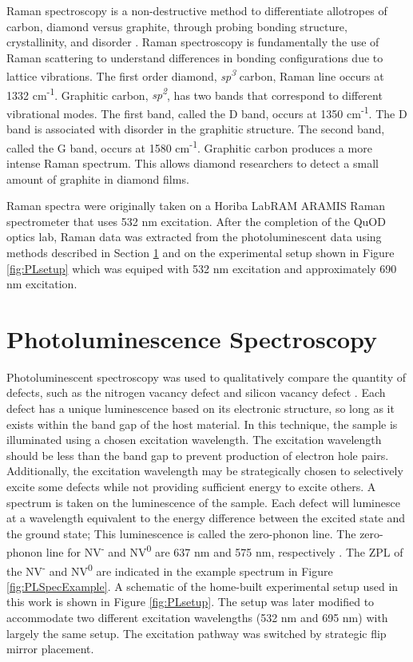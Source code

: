 Raman spectroscopy is a non-destructive method to differentiate allotropes of carbon, diamond versus graphite, through probing bonding structure, crystallinity, and disorder \cite{Knight1989CharacterizationSpectroscopy, Shroder1990AnalysisSpectroscopyb}. Raman spectroscopy is fundamentally the use of Raman scattering to understand differences in bonding configurations due to lattice vibrations. The first order diamond, \textit{sp\textsuperscript{3}} carbon, Raman line occurs at 1332 cm\textsuperscript{-1}. Graphitic carbon, \textit{sp\textsuperscript{2}}, has two bands that correspond to different vibrational modes. The first band, called the D band, occurs at 1350 cm\textsuperscript{-1}. The D band is associated with disorder in the graphitic structure. The second band, called the G band, occurs at 1580 cm\textsuperscript{-1}. Graphitic carbon produces a more intense Raman spectrum. This allows diamond researchers to detect a small amount of graphite in diamond films. 

Raman spectra were originally taken on a Horiba LabRAM ARAMIS Raman spectrometer that uses 532 nm excitation. After the completion of the QuOD optics lab, Raman data was extracted from the photoluminescent data using methods described in Section \ref{PL} and on the experimental setup shown in Figure \ref{fig:PLsetup} which was equiped with 532 nm excitation and approximately 690 nm excitation. 

\section{Photoluminescence Spectroscopy}
\label{PL}
\indent

Photoluminescent spectroscopy was used to qualitatively compare the quantity of defects, such as the nitrogen vacancy defect and silicon vacancy defect \cite{Collins1992TheSpectroscopy}. Each defect has a unique luminescence based on its electronic structure, so long as it exists within the band gap of the host material. In this technique, the sample is illuminated using a chosen excitation wavelength. The excitation wavelength should be less than the band gap to prevent production of electron hole pairs. Additionally, the excitation wavelength may be strategically chosen to selectively excite some defects while not providing sufficient energy to excite others. A spectrum is taken on the luminescence of the sample. Each defect will luminesce at a wavelength equivalent to the energy difference between the excited state and the ground state; This luminescence is called the zero-phonon line. The zero-phonon line for NV\textsuperscript{-} and NV\textsuperscript{0} are 637 nm and 575 nm, respectively \cite{Fraczek2017LaserDiamond}. The ZPL of the NV\textsuperscript{-} and NV\textsuperscript{0} are indicated in the example spectrum in Figure \ref{fig:PLSpecExample}. A schematic of the home-built experimental setup used in this work is shown in Figure \ref{fig:PLsetup}. The setup was later modified to accommodate two different excitation wavelengths (532 nm and 695 nm) with largely the same setup. The excitation pathway was switched by strategic flip mirror placement.

